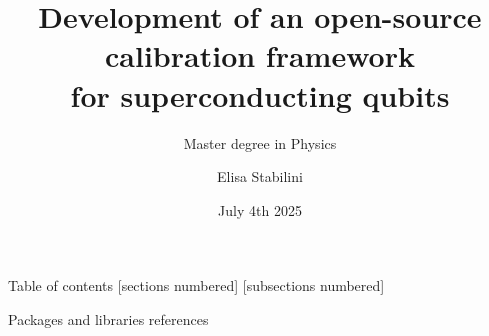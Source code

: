 \documentclass[aspectratio=169,10pt]{beamer}
\title{Development of an open-source calibration framework\\ for superconducting qubits}
\subtitle{Master degree in Physics}
\author{Elisa Stabilini}
\institute{Università degli Studi di Milano - Department of Physics}
\date{July 4th 2025}
\begin{document}
\maketitle

\begin{frame}{Table of contents}
    [sections numbered]
    [subsections numbered]  
    \tableofcontents[hideallsubsections]
\end{frame}


\begin{frame}[allowframebreaks]{Packages and libraries references}
    \nocite{*}
    
    
\end{frame}
\end{document}
